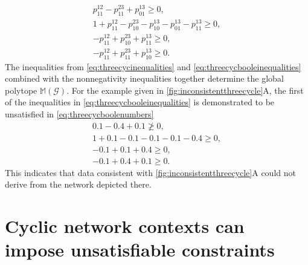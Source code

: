 \documentclass[10pt]{article}
\begin{document}
\begin{equation}
\begin{aligned}\label{eq:threecycbooleinequalities}
p^{12}_{11} - p^{23}_{11} + p^{13}_{01} \geq 0, \\
1 + p^{12}_{11} - p^{23}_{10} - p^{13}_{10} - p^{13}_{01} - p^{13}_{11} \geq 0, \\
-p^{12}_{11} + p^{23}_{10} + p^{13}_{11} \geq 0, \\
-p^{12}_{11} + p^{23}_{11} + p^{13}_{10} \geq 0.
\end{aligned}
\end{equation}
The inequalities from \ref{eq:threecycinequalities} and \ref{eq:threecycbooleinequalities} combined with the nonnegativity inequalities together determine the global polytope $\mathbb{M}(\mathcal{G})$. For the example given in \ref{fig:inconsistentthreecycle}A, the first of the inequalities in \ref{eq:threecycbooleinequalities} is demonstrated to be unsatisfied in \ref{eq:threecycboolenumbers}
\begin{equation}
\begin{aligned}\label{eq:threecycboolenumbers}
0.1 - 0.4 + 0.1 \not\geq 0, \\
1 + 0.1 - 0.1 - 0.1 - 0.1 - 0.4 \geq 0, \\
-0.1 + 0.1 + 0.4 \geq 0, \\
-0.1 + 0.4 + 0.1 \geq 0.
\end{aligned}
\end{equation}
This indicates that data consistent with \ref{fig:inconsistentthreecycle}A could not derive from the network depicted there.



\makeatletter{}\section{Cyclic network contexts can impose unsatisfiable constraints}\label{sec:cycliccontextunsatisfiableconstraints}
\end{document}
